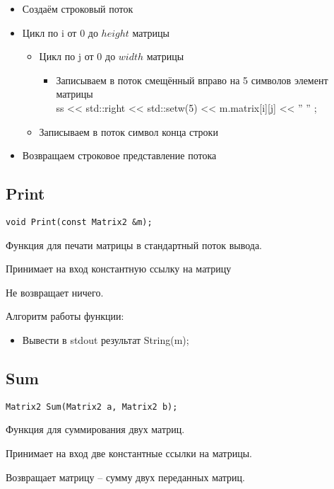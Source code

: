 \begin{itemize}
	\item Создаём строковый поток
	\item Цикл по i от 0 до $ height $ матрицы
	\begin{itemize}
		\item Цикл по j от 0 до $ width $ матрицы
		\begin{itemize}
			\item Записываем в поток смещённый вправо на 5 символов элемент матрицы\\
			ss << std::right << std::setw(5) << m.matrix[i][j] << '' '' ;
		\end{itemize}
		\item Записываем в поток символ конца строки
	\end{itemize}
	\item Возвращаем строковое представление потока
\end{itemize}

\subsection*{Print}

\begin{lstlisting}[label={lst:Print}]
	void Print(const Matrix2 &m);
\end{lstlisting}

Функция для печати матрицы в стандартный поток вывода.

Принимает на вход константную ссылку на матрицу

Не возвращает ничего.

Алгоритм работы функции:

\begin{itemize}
	\item Вывести в stdout результат String(m);
\end{itemize}

\subsection*{Sum}

\begin{lstlisting}[label={lst:Sum}]
	Matrix2 Sum(Matrix2 a, Matrix2 b);
\end{lstlisting}

Функция для суммирования двух матриц.

Принимает на вход две константные ссылки на матрицы.

Возвращает матрицу -- сумму двух переданных матриц.

